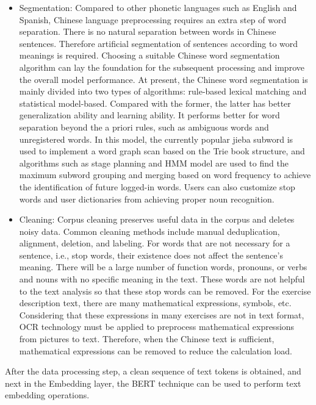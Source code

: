 \begin{itemize}
    \item Segmentation: Compared to other phonetic languages such as English and Spanish, Chinese language preprocessing requires an extra step of word separation.  There is no natural separation between words in Chinese sentences. Therefore artificial segmentation of sentences according to word meanings is required. Choosing a suitable Chinese word segmentation algorithm can lay the foundation for the subsequent processing and improve the overall model performance. At present, the Chinese word segmentation is mainly divided into two types of algorithms: rule-based lexical matching and statistical model-based. Compared with the former, the latter has better generalization ability and learning ability. It performs better for word separation beyond the a priori rules, such as ambiguous words and unregistered words. In this model, the currently popular jieba subword is used to implement a word graph scan based on the Trie book structure, and algorithms such as stage planning and HMM model are used to find the maximum subword grouping and merging based on word frequency to achieve the identification of future logged-in words. Users can also customize stop words and user dictionaries from achieving proper noun recognition.
    \item Cleaning: Corpus cleaning preserves useful data in the corpus and deletes noisy data. Common cleaning methods include manual deduplication, alignment, deletion, and labeling. For words that are not necessary for a sentence, i.e., stop words, their existence does not affect the sentence's meaning. There will be a large number of function words, pronouns, or verbs and nouns with no specific meaning in the text. These words are not helpful to the text analysis so that these stop words can be removed. For the exercise description text, there are many mathematical expressions, symbols, etc. Considering that these expressions in many exercises are not in text format, OCR technology must be applied to preprocess mathematical expressions from pictures to text. Therefore, when the Chinese text is sufficient, mathematical expressions can be removed to reduce the calculation load.
\end{itemize}

After the data processing step, a clean sequence of text tokens is obtained, and next in the Embedding layer, the BERT technique can be used to perform text embedding operations.

